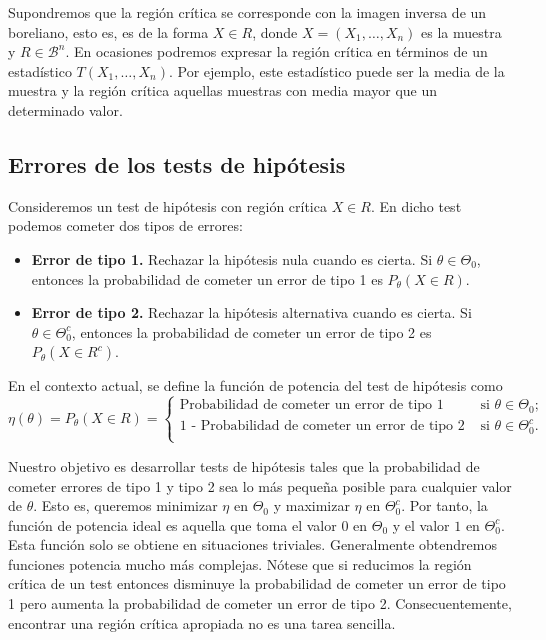 \documentclass{article}
\begin{document}
Supondremos que la región crítica se corresponde con la imagen inversa de un boreliano, esto es, es de la forma $X \in R$, donde $X = (X_1, \ldots, X_n)$ es la muestra y $R \in \mathcal{B}^n$. En ocasiones podremos expresar la región crítica en términos de un estadístico $T(X_1, \ldots, X_n)$. Por ejemplo, este estadístico puede ser la media de la muestra y la región crítica aquellas muestras con media mayor que un determinado valor.

\subsection{Errores de los tests de hipótesis}


Consideremos un test de hipótesis con región crítica $X \in R$. En dicho test podemos cometer dos tipos de errores:

\begin{itemize}
    \item \textbf{Error de tipo 1.} Rechazar la hipótesis nula cuando es cierta. Si $\theta \in \Theta_0$, entonces la probabilidad de cometer un error de tipo 1 es $P_\theta(X \in R)$.
    \item \textbf{Error de tipo 2.} Rechazar la hipótesis alternativa cuando es cierta. Si $\theta \in \Theta_0^c$, entonces la probabilidad de cometer un error de tipo 2 es $P_\theta(X \in R^c)$.
\end{itemize}

\begin{definition}
    En el contexto actual, se define la función de potencia del test de hipótesis como
    \[\eta(\theta) = P_\theta(X \in R) = \begin{cases} \text{Probabilidad de cometer un error de tipo 1} & \text{ si } \theta \in \Theta_0; \\ \text{1 - Probabilidad de cometer un error de tipo 2} & \text{ si } \theta \in \Theta_0^c. \\ \end{cases}\]
\end{definition}

Nuestro objetivo es desarrollar tests de hipótesis tales que la probabilidad de cometer errores de tipo 1 y tipo 2 sea lo más pequeña posible para cualquier valor de $\theta$. Esto es, queremos minimizar $\eta$ en $\Theta_0$ y maximizar $\eta$ en $\Theta_0^c$. Por tanto, la función de potencia ideal es aquella que toma el valor $0$ en $\Theta_0$ y el valor $1$ en $\Theta_0^c$. Esta función solo se obtiene en situaciones triviales. Generalmente obtendremos funciones potencia mucho más complejas. Nótese que si reducimos la región crítica de un test entonces disminuye la probabilidad de cometer un error de tipo 1 pero aumenta la probabilidad de cometer un error de tipo 2. Consecuentemente, encontrar una región crítica apropiada no es una tarea sencilla.
\end{document}
